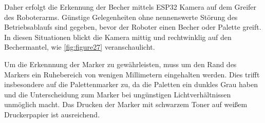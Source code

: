     Daher erfolgt die Erkennung der Becher mittels ESP32 Kamera auf dem Greifer des Roboterarms.
    Günstige Gelegenheiten ohne nennenswerte Störung des Betriebsablaufs sind gegeben, bevor der Roboter einen Becher oder Palette greift.
    In diesen Situationen blickt die Kamera mittig und rechtwinklig auf den Bechermantel, wie \ref{fig:figure27} veranschaulicht.

    Um die Erkennnung der Marker zu gewährleisten, muss um den Rand des Markers ein \glqq Ruhebereich \grqq von wenigen Millimetern eingehalten werden.
    Dies trifft insbesondere auf die Palettenmarker zu, da die Paletten ein dunkles Grau haben und die Unterscheidung zum Marker bei ungünstigen Lichtverhältnissen unmöglich macht.
    Das Drucken der Marker mit schwarzem Toner auf weißem Druckerpapier ist ausreichend.

